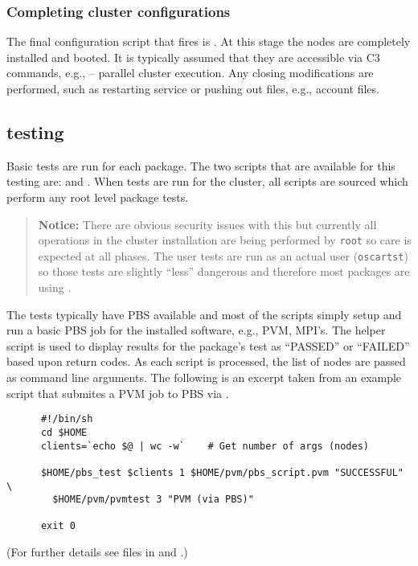 \subsubsection{Completing cluster configurations}

The final configuration script that fires is .  At this
stage the nodes are completely installed and booted.  It is typically
assumed that they are accessible via C3 commands, e.g.,  --
parallel cluster execution.  Any closing modifications are performed, such as
restarting service or pushing out files, e.g.,  account files.


\subsection{testing}
\label{sect:pkg-testing}

Basic tests are run for each package.  The two scripts that are available
for this testing are:  and .  When tests
are run for the cluster, all  scripts are sourced which
perform any root level package tests.  

\begin{verse}
   {\bfseries Notice: } There are obvious security issues with this but
   currently all operations in the cluster installation are being performed
   by {\tt root} so care is expected at all phases.  The user tests are run
   as an actual user ({\tt oscartst}) so those tests are slightly ``less''
   dangerous and therefore most packages are using .
\end{verse}


The tests typically have PBS available and most of the 
scripts simply setup and run a basic PBS job for the installed software,
e.g., PVM, MPI's.  The  helper script is used to display
results for the package's test as ``PASSED'' or ``FAILED'' based upon
return codes.  As each  script is processed, the list of
nodes are passed as command line arguments.  The following is an excerpt
taken from an example  script that submites a PVM job to 
PBS via .
\begin{footnotesize}
\begin{verbatim}
      #!/bin/sh
      cd $HOME
      clients=`echo $@ | wc -w`    # Get number of args (nodes)

      $HOME/pbs_test $clients 1 $HOME/pvm/pbs_script.pvm "SUCCESSFUL" \
        $HOME/pvm/pvmtest 3 "PVM (via PBS)"

      exit 0
\end{verbatim}
\end{footnotesize}
(For further details see files in  and
\file{\$OSCAR\_HOME/lib/OSCAR/Package.pm}.)


